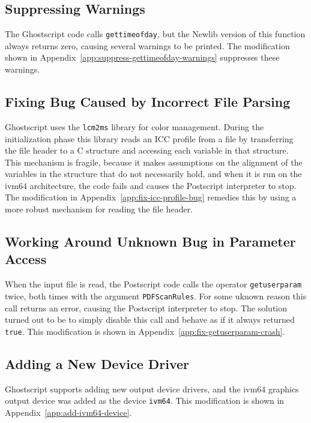 \documentclass[a4paper,11pt]{article}
\newcommand{\code}[1]{\texttt{#1}}
\begin{document}
\subsection{Suppressing Warnings}

The Ghostscript code calls \code{gettimeofday}, but the Newlib version of this function always returns zero, causing several warnings to be printed.
The modification shown in Appendix~\ref{app:suppress-gettimeofday-warnings} suppresses these warnings.

\subsection{Fixing Bug Caused by Incorrect File Parsing}

Ghostscript uses the \code{lcm2ms} library for color management.
During the initialization phase this library reads an ICC profile from a file by transferring the file header to a C structure and accessing each variable in that structure.
This mechanism is fragile, because it makes assumptions on the alignment of the variables in the structure that do not necessarily hold, and when it is run on the ivm64 architecture, the code fails and causes the Postscript interpreter to stop.
The modification in Appendix~\ref{app:fix-icc-profile-bug} remedies this by using a more robust mechanism for reading the file header.

\subsection{Working Around Unknown Bug in Parameter Access}

When the input file is read, the Postscript code calls the operator \code{getuserparam} twice, both times with the argument \code{PDFScanRules}.
For some uknown reason this call returns an error, causing the Postscript interpreter to stop.
The solution turned out to be to simply disable this call and behave as if it always returned \code{true}.
This modification is shown in Appendix~\ref{app:fix-getuserparam-crash}.

\subsection{Adding a New Device Driver}

Ghostscript supports adding new output device drivers, and the ivm64 graphics output device was added as the device \code{ivm64}.
This modification is shown in Appendix~\ref{app:add-ivm64-device}.
\end{document}
